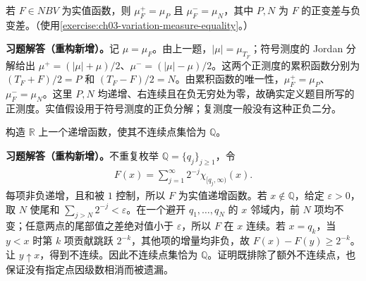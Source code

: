 \documentclass[../../main.tex]{subfiles}%
\begin{document}
\begin{exercise}\label{exercise:ch03-jordan-measure-functions}
若 $F\in NBV$ 为实值函数，则 $\mu_F^+=\mu_P$ 且 $\mu_F^-=\mu_N$，其中 $P,N$ 为 $F$ 的正变差与负变差。（使用\cref{exercise:ch03-variation-measure-equality}。）
\end{exercise}
\begin{solution}
\label{solution:ch03-jordan-measure-functions}
\textbf{习题解答（重构新增）。}记 $\mu=\mu_F$。由上一题，$|\mu|=\mu_{T_F}$；符号测度的 Jordan 分解给出 $\mu^+=(|\mu|+\mu)/2$、$\mu^-=(|\mu|-\mu)/2$。这两个正测度的累积函数分别为 $(T_F+F)/2=P$ 和 $(T_F-F)/2=N$。由累积函数的唯一性，$\mu_F^+=\mu_P$、$\mu_F^-=\mu_N$。这里 $P,N$ 均递增、右连续且在负无穷处为零，故确实定义题目所写的正测度。实值假设用于符号测度的正负分解；复测度一般没有这种正负二分。
\end{solution}

\begin{exercise}\label{exercise:ch03-rational-discontinuities}
构造 $\mathbb R$ 上一个递增函数，使其不连续点集恰为 $\mathbb Q$。
\end{exercise}
\begin{solution}
\label{solution:ch03-rational-discontinuities}
\textbf{习题解答（重构新增）。}不重复枚举 $\mathbb Q=\{q_j\}_{j\ge1}$，令
\begin{align*}
F(x)=\sum_{j=1}^{\infty}2^{-j}\chi_{[q_j,\infty)}(x).
\end{align*}
每项非负递增，且和被 $1$ 控制，所以 $F$ 为实值递增函数。若 $x\notin\mathbb Q$，给定 $\varepsilon>0$，取 $N$ 使尾和 $\sum_{j>N}2^{-j}<\varepsilon$。在一个避开 $q_1,\ldots,q_N$ 的 $x$ 邻域内，前 $N$ 项均不变；任意两点的尾部值之差绝对值小于 $\varepsilon$，所以 $F$ 在 $x$ 连续。若 $x=q_k$，当 $y<x$ 时第 $k$ 项贡献跳跃 $2^{-k}$，其他项的增量均非负，故 $F(x)-F(y)\ge2^{-k}$。让 $y\uparrow x$，得到不连续。因此不连续点集恰为 $\mathbb Q$。证明既排除了额外不连续点，也保证没有指定点因级数相消而被遗漏。
\end{solution}
\end{document}
